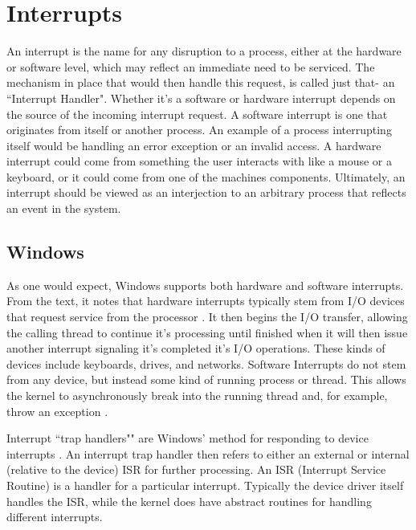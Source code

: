 \documentclass[10pt,draftclsnofoot,onecolumn]{IEEEtran}
\begin{document}
\section{Interrupts}
\label{sec:Interrupts}
\par An interrupt is the name for any disruption to a process, either at the hardware or software level, which may reflect an immediate need to be serviced.
The mechanism in place that would then handle this request, is called just that- an ``Interrupt Handler".
Whether it's a software or hardware interrupt depends on the source of the incoming interrupt request.
A software interrupt is one that originates from itself or another process.
An example of a process interrupting itself would be handling an error exception or an invalid access.
A hardware interrupt could come from something the user interacts with like a mouse or a keyboard, or it could come from one of the machines components.
Ultimately, an interrupt should be viewed as an interjection to an arbitrary process that reflects an event in the system.

\subsection{Windows}
\label{sub:Interrupts Windows}
\par As one would expect, Windows supports both hardware and software interrupts.
From the text, it notes that hardware interrupts typically stem from I/O devices that request service from the processor \cite{win:1}.
It then begins the I/O transfer, allowing the calling thread to continue it's processing until finished when it will then issue another interrupt signaling it's completed it's I/O operations.
These kinds of devices include keyboards, drives, and networks.
Software Interrupts do not stem from any device, but instead some kind of running process or thread.
This allows the kernel to asynchronously break into the running thread and, for example, throw an exception \cite{win:1}.

\par Interrupt ``trap handlers"" are Windows' method for responding to device interrupts \cite{win:1}.
An interrupt trap handler then refers to either an external or internal (relative to the device) ISR for further processing.
An ISR (Interrupt Service Routine) is a handler for a particular interrupt.
Typically the device driver itself handles the ISR, while the kernel does have abstract routines for handling different interrupts.
\end{document}
